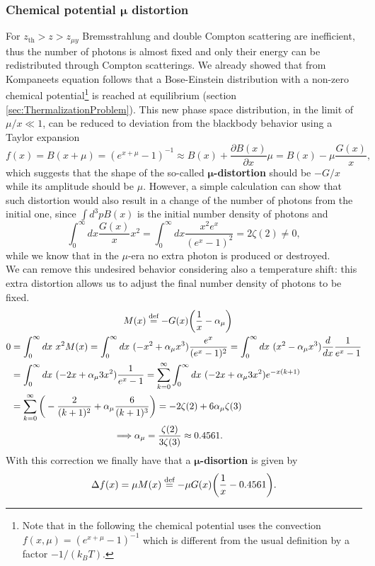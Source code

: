 \subsubsection{Chemical potential $\boldsymbol\mu$ distortion}
For $z_\text{th}>z>z_{\mu y}$ Bremsstrahlung and double Compton scattering are inefficient, thus the number of photons is almost fixed and only their energy can be redistributed through Compton scatterings. We already showed that from Kompaneets equation follows that a Bose-Einstein distribution with a non-zero chemical potential\footnote{Note that in the following the chemical potential uses the convection $f(x,\mu)=(e^{x+\mu}-1)^{-1}$ which is different from the usual definition by a factor $-1/(k_BT)$.} is reached at equilibrium (section \ref{sec:ThermalizationProblem}). This new phase space distribution, in the limit of $\mu/x\ll1$, can be reduced to deviation from the blackbody behavior using a Taylor expansion
$$f(x)=B(x+\mu)=(e^{x+\mu}-1)^{-1}\approx B(x)+\frac{\partial B(x)}{\partial x}\mu=B(x)-\mu\frac{G(x)}{x},$$
which suggests that the shape of the so-called $\boldsymbol\mu$\textbf{-distortion} should be $-G/x$ while its amplitude should be $\mu$. However, a simple calculation can show that such distortion would also result in a change of the number of photons from the initial one, since $\int d^3p B(x)$ is the initial number density of photons and
$$\int_0^\infty dx \frac{G(x)}{x}x^2=\int_0^\infty dx \frac{x^2e^x}{(e^x-1)^2}=2\zeta(2)\neq0,$$
while we know that in the $\mu$-era no extra photon is produced or destroyed.\\ 
We can remove this undesired behavior considering also a temperature shift: this extra distortion allows us to adjust the final number density of photons to be fixed.
\begin{align}
    \label{eq:SD_mu}
    &\qquad\qquad\qquad\qquad\qquad\qquad M(x)\defeq-G(x)\bigg(\frac{1}{x}-\alpha_\mu\bigg)\\
    0&=\int_0^\infty dx\ x^2M(x)=\int_0^\infty dx\ (-x^2+\alpha_\mu x^3)\frac{e^x}{(e^x-1)^2}=\int_0^\infty dx\ (x^2-\alpha_\mu x^3)\frac{d}{dx}\frac{1}{e^x-1}\nonumber\\&=\int_0^\infty dx\ (-2x+\alpha_\mu 3x^2)\frac{1}{e^x-1}=\sum_{k=0}^{\infty}\int_0^\infty dx\ (-2x+\alpha_\mu 3x^2)e^{-x(k+1)}\nonumber\\&=\sum_{k=0}^{\infty}\bigg(-\frac{2}{(k+1)^2}+\alpha_\mu\frac{6}{(k+1)^3}\bigg)=-2\zeta(2)+6\alpha_\mu\zeta(3)\nonumber\\
    &\qquad\qquad\qquad\quad\qquad\qquad\Longrightarrow\alpha_\mu=\frac{\zeta(2)}{3\zeta(3)}\approx0.4561.\nonumber
\end{align}
With this correction we finally have that a $\boldsymbol\mu$\textbf{-disortion} is given by$$\Delta f(x)=\mu M(x)\stackrel{\text{def}}{=}-\mu G(x)\bigg(\frac{1}{x}-0.4561\bigg).$$

